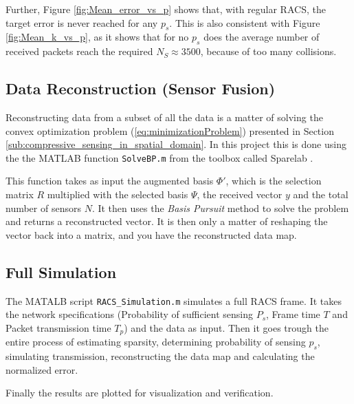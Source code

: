 \documentclass[Main]{subfiles}
\begin{document}
		Further, Figure \ref{fig:Mean_error_vs_p} shows that, with regular RACS, the target error is never reached for any $p_s$.
		This is also consistent with Figure \ref{fig:Mean_k_vs_p}, as it shows that for no $p_s$ does the average number of received packets reach the required $N_S \approx 3500$, because of too many collisions.


	\subsection{Data Reconstruction (Sensor Fusion)} %
	\label{sub:data_reconstruction}

		Reconstructing data from a subset of all the data is a matter of solving the convex optimization problem (\ref{eq:minimizationProblem}) presented in Section \ref{sub:compressive_sensing_in_spatial_domain}.
		In this project this is done using the the MATLAB function \texttt{SolveBP.m} from the toolbox called Sparelab \cite{SparseLab:Online}.
		
		This function takes as input the augmented basis $\Phi'$, which is the selection matrix $R$ multiplied with the selected basis $\Psi$, the received vector $y$ and the total number of sensors $N$.
		It then uses the \emph{Basis Pursuit} method to solve the problem and returns a reconstructed vector.
		It is then only a matter of reshaping the vector back into a matrix, and you have the reconstructed data map.

	

	\subsection{Full Simulation} %
		\label{sub:full_simulation}

		The MATALB script \texttt{RACS\_Simulation.m} simulates a full RACS frame.
		It takes the network specifications (Probability of sufficient sensing $P_s$, Frame time $T$ and Packet transmission time $T_p$) and the data as input.
		Then it goes trough the entire process of estimating sparsity, determining probability of sensing $p_s$, simulating transmission, reconstructing the data map and calculating the normalized error.

		Finally the results are plotted for visualization and verification.
		

\end{document}
